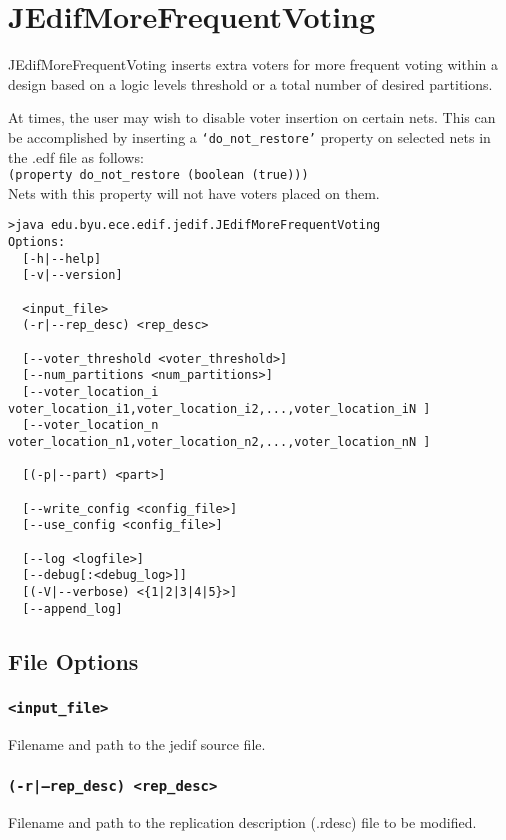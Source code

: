 \section{JEdifMoreFrequentVoting}
JEdifMoreFrequentVoting inserts extra voters for more frequent voting within
a design based on a logic levels threshold or a total number of desired
partitions.

At times, the user may wish to disable voter insertion on certain nets. This
can be accomplished by inserting a \texttt{`do\_not\_restore'} property on
selected nets in the .edf file as follows:\\
\texttt{(property do\_not\_restore (boolean (true)))}\\

Nets with this property will not have voters placed on them.

\begin{verbatim}
>java edu.byu.ece.edif.jedif.JEdifMoreFrequentVoting
Options:
  [-h|--help]
  [-v|--version]

  <input_file>
  (-r|--rep_desc) <rep_desc>

  [--voter_threshold <voter_threshold>]
  [--num_partitions <num_partitions>]
  [--voter_location_i voter_location_i1,voter_location_i2,...,voter_location_iN ]
  [--voter_location_n voter_location_n1,voter_location_n2,...,voter_location_nN ]

  [(-p|--part) <part>]

  [--write_config <config_file>]
  [--use_config <config_file>]

  [--log <logfile>]
  [--debug[:<debug_log>]]
  [(-V|--verbose) <{1|2|3|4|5}>]
  [--append_log]

\end{verbatim}

\subsection{File Options}

\subsubsection{\texttt{<input\_file>}}
Filename and path to the jedif source file.

\subsubsection{\texttt{(-r|--rep\_desc) <rep\_desc>}}
Filename and path to the replication description (.rdesc) file to be modified.

